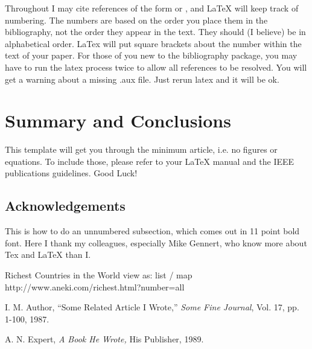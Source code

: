 Throughout I may cite references of the form \cite{key:foo} or
\cite{foo:baz}, and LaTeX will keep track of numbering.  The numbers are based
on the order you place them in the bibliography, not the order they appear in
the text.  They should (I believe) be in alphabetical order.  LaTex will put
square brackets about the number within the text of your paper.  For those of 
you new to the bibliography package, you may have to run the latex process 
twice to allow all references to be resolved.  You will get a warning about
a missing .aux file.  Just rerun latex and it will be ok.

\section{Summary and Conclusions}
This template will get you through the minimum article, i.e. no figures or
equations.  To include those, please refer to your LaTeX manual and the IEEE
publications guidelines.  Good Luck!

\subsection*{Acknowledgements}
This is how to do an unnumbered subsection, which comes out in 11 point bold
font.  Here I thank my colleagues, especially Mike Gennert, who know more 
about Tex and LaTeX than I.

\begin{thebibliography}{9}

Richest Countries in the World
view as: list / map
http://www.aneki.com/richest.html?number=all

I. M. Author, 
``Some Related Article I Wrote,''
{\em Some Fine Journal}, Vol. 17, pp. 1-100, 1987.

A. N. Expert, 
{\em A Book He Wrote,}
His Publisher, 1989.



\end{thebibliography}


